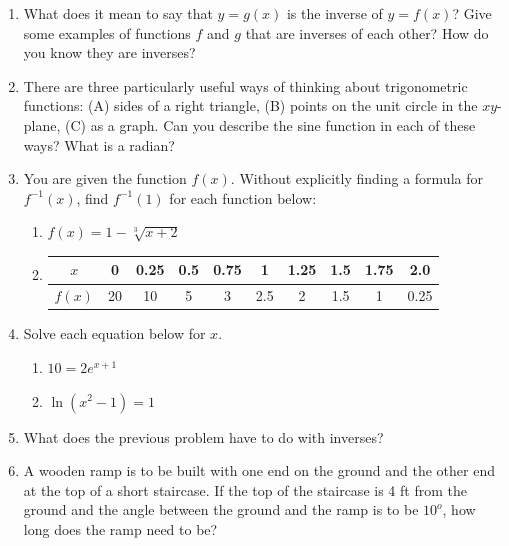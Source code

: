 \documentclass[11pt,fleqn]{article}
\begin{document}
\renewcommand{\headrulewidth}{0pt}
\newcommand{\blank}[1]{\rule{#1}{0.75pt}}
\renewcommand{\d}{\displaystyle}
\vspace*{-0.7in}
\begin{center}
  \large {}
\end{center}


\begin{enumerate}
\item What does it mean to say that $y=g(x)$ is the inverse of $y=f(x)$? Give some examples of functions $f$ and $g$ that are inverses of each other? How do you know they are inverses?
\vfill

\item There are three particularly useful ways of thinking about trigonometric functions: (A) sides of a right triangle, (B) points on the  unit circle in the $xy$-plane, (C) as a graph. Can you describe the sine function in each of these ways?
\vfill
What is a radian?
\newpage
\item You are given the function $f(x)$. Without explicitly finding a formula for $f^{-1}(x)$, find $f^{-1}(1)$ for each function below:\\
\begin{multicols}{3}
\begin{enumerate}
	\item $f(x)=1-\sqrt[3]{x+2}$
	\item \begin{tabular}{|c||c|c|c|c|c|c|c|c|c|}
$x$&0&0.25&0.5&0.75&1&1.25&1.5&1.75&2.0\\
\hline
$f(x)$&20&10&5&3&2.5&2&1.5&1&0.25\\
\end{tabular}
\end{enumerate}
\end{multicols}
\vfill
\item Solve each equation below for $x$.
\begin{multicols}{2}
\begin{enumerate}
	\item $10=2e^{x+1}$
	\item $\ln (x^2-1)=1$
	\end{enumerate}
	\end{multicols}
	\vfill
\item What does the previous problem have to do with inverses?\\
\vspace{1in}
\newpage
\item A wooden ramp is to be built with one end on the ground and the other end at the top of a short staircase. If the top of the staircase is  4 ft from the ground and the angle between the ground and the ramp is to be $10^o$,  how long does the ramp need to be?\\

\end{enumerate}
\end{document}
